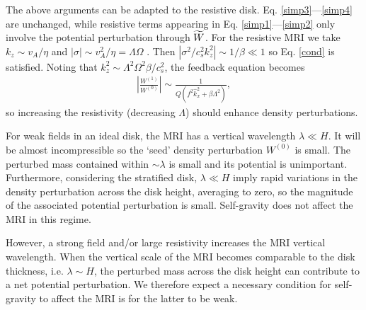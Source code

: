  

 The above arguments can be adapted to the resistive
 disk. Eq. \ref{simp3}---\ref{simp4} are unchanged, while resistive
 terms appearing in Eq. \ref{simp1}---\ref{simp2} only involve the
 potential perturbation through $\widetilde{W}$. For the resistive MRI we take
 $k_z\sim v_A/\eta$ and $|\sigma|\sim v_A^2/\eta = \Lambda\Omega$
 \citep{sano99}. Then $|\sigma^2/c_s^2k_z^2|\sim 1/\beta \ll 1$ so
 Eq. \ref{cond} is satisfied. Noting that $k_z^2\sim
 \Lambda^2\Omega^2\beta/c_s^2$, the feedback equation becomes
 \begin{align}
   \left|\frac{W^{(1)}}{W^{(0)}}\right| \sim
   \frac{1}{Q\left(f^2\hat{k}_x^2 + \beta\Lambda^2\right)},
 \end{align}
 so increasing the resistivity (decreasing $\Lambda$) should enhance
 density perturbations.  


 For weak fields in an ideal disk, the MRI has a vertical
 wavelength $\lambda \ll H$. It will be almost incompressible so the 
 `seed' density perturbation $W^{(0)}$ is small.  
 The perturbed mass contained within 
 $\sim \lambda$ is small and its potential is
 unimportant. Furthermore, considering the stratified  
 disk, $\lambda\ll H$ imply rapid variations in the density
 perturbation across the disk height, averaging to zero, so the
 magnitude of the associated potential perturbation is small. 
 Self-gravity does not affect the MRI in this regime.   
 

 However, a strong field and/or large resistivity increases the MRI
 vertical wavelength. When the vertical scale of the MRI becomes
 comparable to the disk thickness, i.e. $\lambda\sim H$, the
 perturbed mass across the disk height can contribute to a net potential
 perturbation. We therefore expect a necessary condition for
 self-gravity to affect the MRI is for the latter to be weak. 

